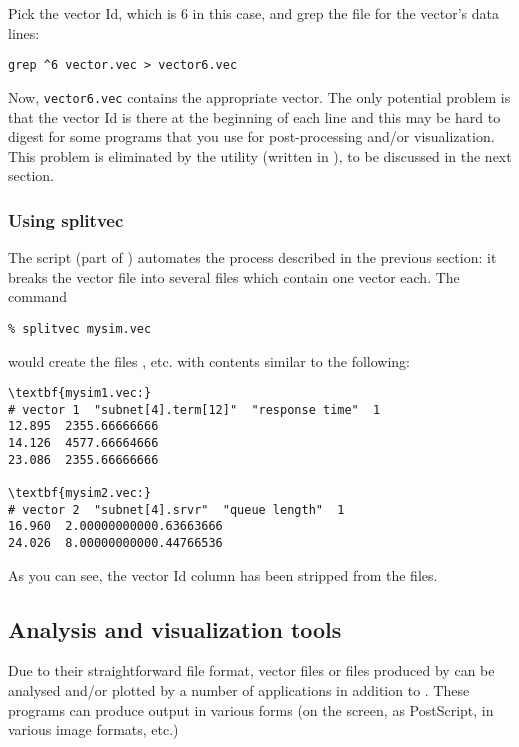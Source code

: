 Pick the vector Id, which is 6 in this case, and grep the file
for the vector's data lines:

\begin{verbatim}
grep ^6 vector.vec > vector6.vec
\end{verbatim}


Now, \texttt{vector6.vec} contains the appropriate vector. The only
potential problem is that the vector Id is there at the beginning of
each line and this may be hard to digest for some programs that you
use for post-processing and/or visualization. This problem is
eliminated by the {\opp}  utility (written in
), to be discussed in the next section.




\subsubsection{Using splitvec}

The  script (part of {\opp}) automates the process described
in the previous section: it breaks the vector file into several files which
contain one vector each. The command

\begin{verbatim}
% splitvec mysim.vec
\end{verbatim}

would create the files ,  etc. with
contents similar to the following:

\begin{Verbatim}[commandchars=\\\{\}]
\textbf{mysim1.vec:}
# vector 1  "subnet[4].term[12]"  "response time"  1
12.895  2355.66666666
14.126  4577.66664666
23.086  2355.66666666

\textbf{mysim2.vec:}
# vector 2  "subnet[4].srvr"  "queue length"  1
16.960  2.00000000000.63663666
24.026  8.00000000000.44766536
\end{Verbatim}


As you can see, the vector Id column has been stripped from the files.




\subsection{Analysis and visualization tools}

Due to their straightforward file format, vector files or files
produced by  can be analysed and/or plotted by
a number of applications in addition to .
These programs can produce output in various forms (on the screen,
as PostScript, in various image formats, etc.)

